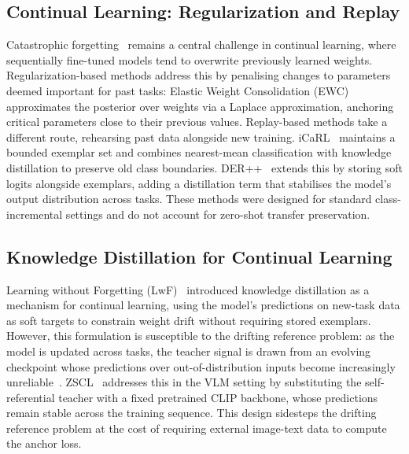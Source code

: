 \documentclass{article}
\begin{document}
  \subsection{Continual Learning: Regularization and Replay}
  Catastrophic forgetting~\cite{mccloskey1989catastrophic} remains a central
  challenge in continual learning, where sequentially fine-tuned models tend to
  overwrite previously learned weights. Regularization-based methods address this
  by penalising changes to parameters deemed important for past tasks: Elastic Weight Consolidation (EWC)~\cite{kirkpatrick2017ewc} approximates the posterior over weights via a
  Laplace approximation, anchoring critical parameters close to their previous
  values. Replay-based methods take a different route, rehearsing past data
  alongside new training. iCaRL~\cite{rebuffi2017icarl} maintains a bounded
  exemplar set and combines nearest-mean classification with knowledge distillation
  to preserve old class boundaries. DER++~\cite{buzzega2020dark} extends this by
  storing soft logits alongside exemplars, adding a distillation term that
  stabilises the model's output distribution across tasks. These methods were
  designed for standard class-incremental settings and do not account for zero-shot
  transfer preservation.

  \subsection{Knowledge Distillation for Continual Learning}
  Learning without Forgetting (LwF)~\cite{li2017lwf} introduced knowledge
  distillation as a mechanism for continual learning, using the model's predictions
  on new-task data as soft targets to constrain weight drift without requiring
  stored exemplars. However, this formulation is susceptible to the drifting
  reference problem: as the model is updated across tasks, the teacher signal is
  drawn from an evolving checkpoint whose predictions over out-of-distribution
  inputs become increasingly unreliable~\cite{li2017lwf}. ZSCL~\cite{zheng2023zscl}
  addresses this in the VLM setting by substituting the self-referential teacher
  with a fixed pretrained CLIP backbone, whose predictions remain stable across the
  training sequence. This design sidesteps the drifting reference problem at the
  cost of requiring external image-text data to compute the anchor loss.
\end{document}
